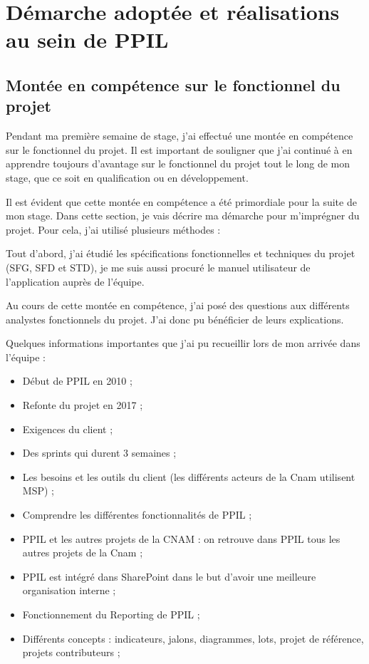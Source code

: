 \chapter{Démarche adoptée et réalisations au sein de PPIL}
\label{chap:premierchapitre}


\section{Montée en compétence sur le fonctionnel du projet}

Pendant ma première semaine de stage, j'ai effectué une montée en compétence sur le fonctionnel du projet. Il est important de souligner que j'ai continué à en apprendre toujours d'avantage sur le fonctionnel du projet tout le long de mon stage, que ce soit en qualification ou en développement.

Il est évident que cette montée en compétence a été primordiale pour la suite de mon stage. Dans cette section, je vais décrire ma démarche pour m'imprégner du projet. Pour cela, j'ai utilisé plusieurs méthodes :

Tout d'abord, j'ai étudié les spécifications fonctionnelles et techniques du projet (SFG, SFD et STD), je me suis aussi procuré le manuel utilisateur de l'application auprès de l'équipe.

Au cours de cette montée en compétence, j'ai posé des questions aux différents analystes fonctionnels du projet. J'ai donc pu bénéficier de leurs explications.

Quelques informations importantes que j'ai pu recueillir lors de mon arrivée dans l'équipe :
\begin{itemize}
    \item Début de PPIL en 2010 ;
    \item Refonte du projet en 2017 ;
    \item Exigences du client ;
    \item Des sprints qui durent 3 semaines ;
    \item Les besoins et les outils du client (les différents acteurs de la Cnam utilisent MSP) ;
    \item Comprendre les différentes fonctionnalités de PPIL ;
    \item PPIL et les autres projets de la CNAM : on retrouve dans PPIL tous les autres projets de la Cnam ;
    \item PPIL est intégré dans SharePoint dans le but d'avoir une meilleure organisation interne ;
    \item Fonctionnement du Reporting de PPIL ;
    \item Différents concepts : indicateurs, jalons, diagrammes, lots, projet de référence, projets contributeurs ; 
\end{itemize}

